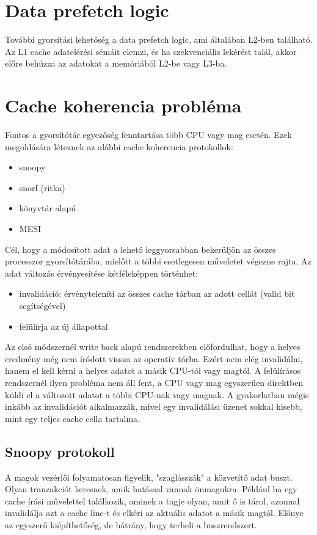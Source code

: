 \section{Data prefetch logic}
További gyorsítási lehetőség a data prefetch logic, ami általában L2-ben található.
Az L1 cache adatelérési sémáit elemzi, és ha szekvenciális lekérést talál, akkor előre behúzza az adatokat a memóriából L2-be vagy L3-ba.

\section{Cache koherencia probléma}
Fontos a gyorsítótár egyezőség fenntartása több CPU vagy mag esetén.
Ezek megoldására léteznek az alábbi cache koherencia protokollok:
\begin{itemize}
    \item snoopy
    \item snorf (ritka)
    \item könyvtár alapú
    \item MESI
\end{itemize}
Cél, hogy a módosított adat a lehető leggyorsabban bekerüljön az összes processzor gyorsítótárába, mielőtt a többi esetlegesen műveletet végezne rajta.
Az adat változás érvényesítése kétféleképpen történhet:
\begin{itemize}
    \item invalidáció: érvényteleníti az összes cache tárban az adott cellát (valid bit segítségével)
    \item felülírja az új állapottal
\end{itemize}
Az első módszernél write back alapú rendszerekben előfordulhat, hogy a helyes eredmény még nem íródott vissza az operatív tárba.
Ezért nem elég invalidálni, hanem el kell kérni a helyes adatot a másik CPU-tól vagy magtól.
A felülírásos rendszernél ilyen probléma nem áll fent, a CPU vagy mag egyszerűen direktben küldi el a változott adatot a többi CPU-nak vagy magnak.
A gyakorlatban mégis inkább az invalidációt alkalmazzák, mivel egy invalidálási üzenet sokkal kisebb, mint egy teljes cache cella tartalma.

\subsection{Snoopy protokoll}
A magok vezérlői folyamatosan figyelik, "szaglásszák" a közvetítő adat buszt.
Olyan tranzakciót keresnek, amik hatással vannak önmagukra.
Például ha egy cache írási művelettel találkozik, aminek a tagje olyan, amit ő is tárol, azonnal invalidálja azt a cache line-t és elkéri az aktuális adatot a másik magtól.
Előnye az egyszerű kiépíthetőség, de hátrány, hogy terheli a buszrendszert.

